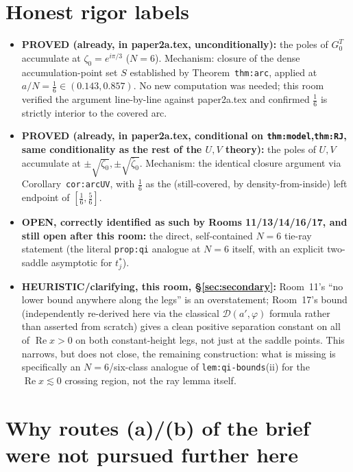 \documentclass[11pt]{article}
\begin{document}
\section*{Honest rigor labels}

\begin{itemize}
\item \textbf{PROVED (already, in paper2a.tex, unconditionally):} the poles of $G^T_0$ accumulate at
$\zeta_0=e^{i\pi/3}$ ($N=6$). Mechanism: closure of the dense accumulation-point set $S$ established
by Theorem~\texttt{thm:arc}, applied at $a/N=\frac16\in(0.143,0.857)$. No new computation was needed;
this room verified the argument line-by-line against paper2a.tex and confirmed $\frac16$ is strictly
interior to the covered arc.
\item \textbf{PROVED (already, in paper2a.tex, conditional on \texttt{thm:model},\texttt{thm:RJ},
same conditionality as the rest of the $U,V$ theory):} the poles of $U,V$ accumulate at $\pm\sqrt{
\zeta_0},\pm\sqrt{\bar\zeta_0}$. Mechanism: the identical closure argument via
Corollary~\texttt{cor:arcUV}, with $\frac16$ as the (still-covered, by density-from-inside) left
endpoint of $[\frac16,\frac56]$.
\item \textbf{OPEN, correctly identified as such by Rooms 11/13/14/16/17, and still open after this
room:} the direct, self-contained $N=6$ tie-ray statement (the literal \texttt{prop:qi} analogue at
$N=6$ itself, with an explicit two-saddle asymptotic for $t^\ast_j$).
\item \textbf{HEURISTIC/clarifying, this room, \S\ref{sec:secondary}:} Room~11's ``no lower bound
anywhere along the legs'' is an overstatement; Room~17's bound (independently re-derived here via
the classical $\mathcal D(a',\varphi)$ formula rather than asserted from scratch) gives a clean
positive separation constant on all of $\operatorname{Re}x>0$ on both constant-height legs, not just
at the saddle points. This narrows, but does not close, the remaining construction: what is missing
is specifically an $N=6$/six-class analogue of \texttt{lem:qi-bounds}(ii) for the
$\operatorname{Re}x\lesssim0$ crossing region, not the ray lemma itself.
\end{itemize}

\section*{Why routes (a)/(b) of the brief were not pursued further here}
\end{document}
